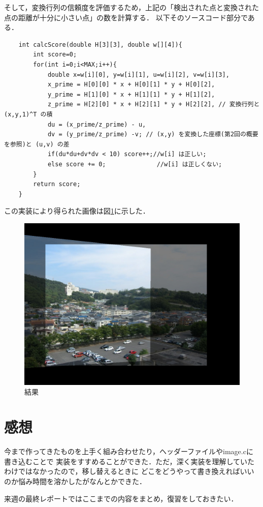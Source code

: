 \documentclass[11pt]{jarticle}
\begin{document}
そして，変換行列の信頼度を評価するため，上記の「検出された点と変換された点の距離が十分に小さい点」の数を計算する．
以下そのソースコード部分である．
\begin{verbatim}
    int calcScore(double H[3][3], double w[][4]){
        int score=0;
        for(int i=0;i<MAX;i++){
            double x=w[i][0], y=w[i][1], u=w[i][2], v=w[i][3],
            x_prime = H[0][0] * x + H[0][1] * y + H[0][2],
            y_prime = H[1][0] * x + H[1][1] * y + H[1][2],
            z_prime = H[2][0] * x + H[2][1] * y + H[2][2], // 変換行列と (x,y,1)^T の積
            du = (x_prime/z_prime) - u,
            dv = (y_prime/z_prime) -v; // (x,y) を変換した座標(第2回の概要を参照)と (u,v) の差
            if(du*du+dv*dv < 10) score++;//w[i] は正しい;
            else score += 0;              //w[i] は正しくない;
        }
        return score;
    }    
\end{verbatim}

この実装により得られた画像は図\ref{last}に示した．

\begin{figure}[ht]
\centering
\includegraphics[scale=.5]{dai8.jpg}
\caption{結果}
\label{last}
\end{figure}

\section{感想}
今まで作ってきたものを上手く組み合わせたり，ヘッダーファイルやimage.cに書き込むことで
実装をすすめることができた．ただ，深く実装を理解していたわけではなかったので，移し替えるときに
どこをどうやって書き換えればいいのか悩み時間を溶かしたがなんとかできた．

来週の最終レポートではここまでの内容をまとめ，復習をしておきたい．
\end{document}
